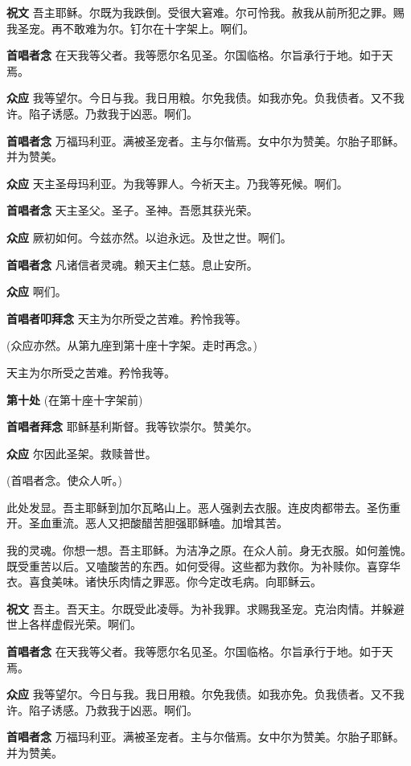 \documentclass[UTF8,17pt]{ctexart}
\begin{document}
\textbf{祝⽂} \quad 吾主耶稣。尔既为我跌倒。受很⼤窘难。尔可怜我。赦我从前所犯之罪。赐我圣宠。再不敢难为尔。钉尔在⼗字架上。啊们。

\textbf{⾸唱者念} \quad 在天我等⽗者。我等愿尔名见圣。尔国临格。尔旨承⾏于地。如于天焉。

\textbf{众应} \quad 我等望尔。今⽇与我。我⽇⽤粮。尔免我债。如我亦免。负我债者。又不我许。陷⼦诱感。乃救我于凶恶。啊们。

\textbf{⾸唱者念} \quad 万福玛利亚。满被圣宠者。主与尔偕焉。⼥中尔为赞美。尔胎⼦耶稣。并为赞美。

\textbf{众应} \quad 天主圣母玛利亚。为我等罪⼈。今祈天主。乃我等死候。啊们。

\textbf{⾸唱者念} \quad 天主圣⽗。圣⼦。圣神。吾愿其获光荣。

\textbf{众应} \quad 厥初如何。今兹亦然。以迨永远。及世之世。啊们。

\textbf{⾸唱者念} \quad 凡诸信者灵魂。赖天主仁慈。息⽌安所。

\textbf{众应} \quad 啊们。


\textbf{⾸唱者叩拜念} \quad 天主为尔所受之苦难。矜怜我等。

(众应亦然。从第九座到第十座⼗字架。⾛时再念。)

天主为尔所受之苦难。矜怜我等。

\textbf{第十处} (在第十座⼗字架前)

\textbf{⾸唱者拜念} \quad 耶稣基利斯督。我等钦崇尔。赞美尔。

\textbf{众应} \quad 尔因此圣架。救赎普世。

(⾸唱者念。使众⼈听。)

此处发显。吾主耶稣到加尔⽡略⼭上。恶⼈强剥去⾐服。连⽪⾁都带去。圣伤重开。圣⾎重流。恶⼈又把酸醋苦胆强耶稣嗑。加增其苦。

我的灵魂。你想⼀想。吾主耶稣。为洁净之原。在众⼈前。⾝⽆⾐服。如何羞愧。既受重苦以后。又嗑酸苦的东西。如何受得。这些都为救你。为补赎你。喜穿华⾐。喜⾷美味。诸快乐⾁情之罪恶。你今定改⽑病。向耶稣云。

\textbf{祝⽂} \quad 吾主。吾天主。尔既受此凌辱。为补我罪。求赐我圣宠。克治⾁情。并躲避世上各样虚假光荣。啊们。

\textbf{⾸唱者念} \quad 在天我等⽗者。我等愿尔名见圣。尔国临格。尔旨承⾏于地。如于天焉。

\textbf{众应} \quad 我等望尔。今⽇与我。我⽇⽤粮。尔免我债。如我亦免。负我债者。又不我许。陷⼦诱感。乃救我于凶恶。啊们。

\textbf{⾸唱者念} \quad 万福玛利亚。满被圣宠者。主与尔偕焉。⼥中尔为赞美。尔胎⼦耶稣。并为赞美。
\end{document}
